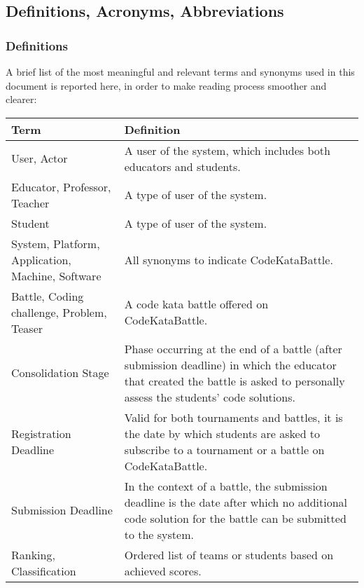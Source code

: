 \subsection{Definitions, Acronyms, Abbreviations}

\subsubsection{Definitions}
A brief list of the most meaningful and relevant terms and synonyms used in this document is reported here, in order to make reading process smoother and clearer:

\renewcommand{\arraystretch}{2.3}
\setlength{\tabcolsep}{0.8cm}
\begin{longtable}[]{m{5cm} m{9cm}}
	\textbf{Term} & \textbf{Definition}\\
	\hline \endhead 
	
	User, Actor & A user of the \app system, which includes both educators and students.\\
	
	Educator, Professor, Teacher & A type of user of the \app system.\\
	
	Student & A type of user of the \app system.\\
	
	System, Platform, Application, Machine, Software & All synonyms to indicate CodeKataBattle.\\
	
	Battle, Coding challenge, Problem, Teaser & A code kata battle offered on CodeKataBattle.\\
	
	Consolidation Stage & Phase occurring at the end of a battle (after submission deadline) in which the educator that created the battle is asked to personally assess the students' code solutions.\\
	
	Registration Deadline & Valid for both tournaments and battles, it is the date by which students are asked to subscribe to a tournament or a battle on CodeKataBattle.\\
	
	Submission Deadline & In the context of a battle, the submission deadline is the date after which no additional code solution for the battle can be submitted to the system.\\
	
	Ranking, Classification & Ordered list of teams or students based on achieved scores.\\
	

\end{longtable}

